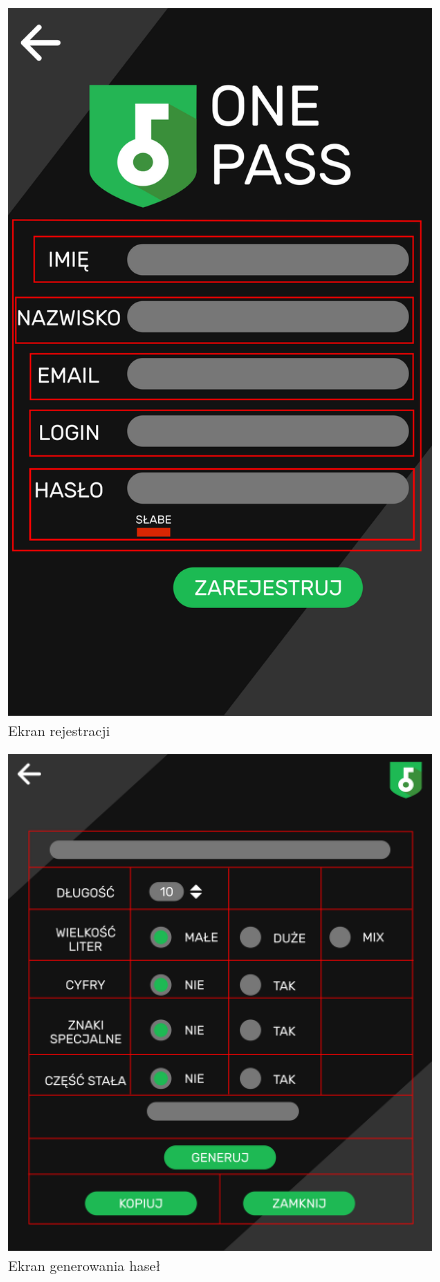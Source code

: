 \documentclass[a4paper]{article}
\begin{document}
\begin{figure}[H]
    \centering
    \includegraphics[height=1\textwidth]{img/ekran_rej.png}
    \caption{Ekran rejestracji}
    \label{fig:rejestracja}
\end{figure}

\begin{figure}[H]
    \centering
    \includegraphics[height=1\textwidth]{img/ekran_generacji.png}
    \caption{Ekran generowania haseł}
    \label{fig:profil}
\end{figure}
\end{document}
